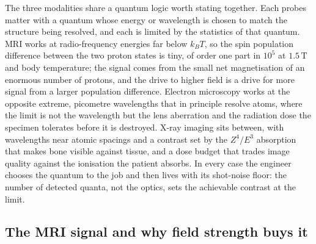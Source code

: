 The three modalities share a quantum logic worth stating together. Each
probes matter with a quantum whose energy or wavelength is chosen to
match the structure being resolved, and each is limited by the
statistics of that quantum. MRI works at radio-frequency energies far
below $k_{B}T$, so the spin population difference between the two proton
states is tiny, of order one part in $10^{5}$ at $1.5\,\si{\tesla}$ and
body temperature; the signal comes from the small net magnetisation of
an enormous number of protons, and the drive to higher field is a drive
for more signal from a larger population difference. Electron microscopy
works at the opposite extreme, picometre wavelengths that in principle
resolve atoms, where the limit is not the wavelength but the lens
aberration and the radiation dose the specimen tolerates before it is
destroyed. X-ray imaging sits between, with wavelengths near atomic
spacings and a contrast set by the $Z^{4}/E^{3}$ absorption that makes
bone visible against tissue, and a dose budget that trades image quality
against the ionisation the patient absorbs. In every case the engineer
chooses the quantum to the job and then lives with its shot-noise floor:
the number of detected quanta, not the optics, sets the achievable
contrast at the limit.

\subsection{The MRI signal and why field strength buys it}

